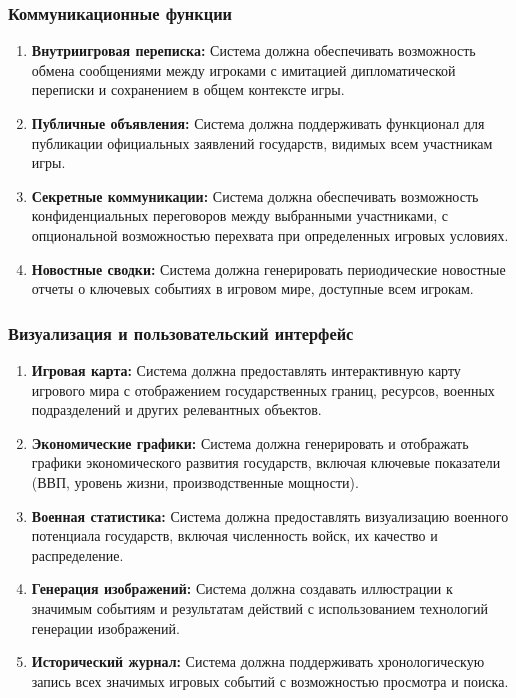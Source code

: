 \subsubsection{Коммуникационные функции}

\begin{enumerate}[label=FR\arabic*., resume]
    \item \textbf{Внутриигровая переписка:} Система должна обеспечивать возможность обмена сообщениями между игроками с имитацией дипломатической переписки и сохранением в общем контексте игры.

    \item \textbf{Публичные объявления:} Система должна поддерживать функционал для публикации официальных заявлений государств, видимых всем участникам игры.

    \item \textbf{Секретные коммуникации:} Система должна обеспечивать возможность конфиденциальных переговоров между выбранными участниками, с опциональной возможностью перехвата при определенных игровых условиях.

    \item \textbf{Новостные сводки:} Система должна генерировать периодические новостные отчеты о ключевых событиях в игровом мире, доступные всем игрокам.
\end{enumerate}

\subsubsection{Визуализация и пользовательский интерфейс}

\begin{enumerate}[label=FR\arabic*., resume]
    \item \textbf{Игровая карта:} Система должна предоставлять интерактивную карту игрового мира с отображением государственных границ, ресурсов, военных подразделений и других релевантных объектов.

    \item \textbf{Экономические графики:} Система должна генерировать и отображать графики экономического развития государств, включая ключевые показатели (ВВП, уровень жизни, производственные мощности).

    \item \textbf{Военная статистика:} Система должна предоставлять визуализацию военного потенциала государств, включая численность войск, их качество и распределение.

    \item \textbf{Генерация изображений:} Система должна создавать иллюстрации к значимым событиям и результатам действий с использованием технологий генерации изображений.

    \item \textbf{Исторический журнал:} Система должна поддерживать хронологическую запись всех значимых игровых событий с возможностью просмотра и поиска.
\end{enumerate}

